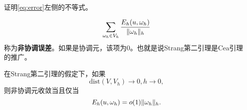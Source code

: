 \begin{exercise}
    证明\eqref{eq:error}左侧的不等式。
\end{exercise}
\begin{remark}
    \begin{equation}
        \sum_{\omega_{h}\in V_{h}}\frac{E_{h}(u,\omega_{h})}{\|\omega_{h}\|_{h}}
    \end{equation}
    称为\textbf{非协调误差}。如果是协调元，该项为0。也就是说Strang第二引理是Cea引理的推广。
\end{remark}
\begin{corollary}
    在Strang第二引理的假定下，如果
    \begin{equation}
        \text{dist}(V,V_{h})\rightarrow 0,h\rightarrow 0,
    \end{equation}
    则非协调元收敛当且仅当
    \begin{equation}
        E_{h}(u,\omega_{h})=o(1)\|\omega_{h}\|_{h}.
    \end{equation}
\end{corollary}